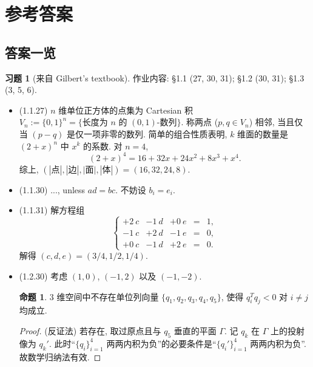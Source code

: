 \documentclass[11pt]{ctexart}
\theoremstyle{definition}
\numberwithin{equation}{section}
\theoremstyle{definition}
\newtheorem*{proposition}{命题}
\newtheorem*{exercise}{习题}
\theoremstyle{remark}
\begin{document}
\newpage

\section{参考答案}

\subsection{答案一览}

\begin{exercise}[来自 Gilbert's textbook]
    作业内容: \S 1.1 (27, 30, 31); \S 1.2 (30, 31); \S 1.3 (3, 5, 6). 
    \begin{aaa}
\begin{itemize}
    \item (1.1.27) $n$ 维单位正方体的点集为 Cartesian 积 $V_n:= \{0,1\}^n=\{\text{长度为 $n$ 的 $(0,1)$-数列}\}$. 称两点 ($p, q\in V_n$) 相邻, 当且仅当 $(p-q)$ 是仅一项非零的数列. 简单的组合性质表明, $k$ 维面的数量是 $(2+x)^n$ 中 $x^k$ 的系数. 对 $n=4$, 
    \begin{equation}
        (2+x)^4 = 16 + 32x + 24x^2 + 8x^3 + x^4. 
    \end{equation}
    综上, $(|\text{点}|, |\text{边}|, |\text{面}|, |\text{体}|)=(16,32,24,8)$. 
    \item (1.1.30) ..., unless $ad=bc$. 不妨设 $b_i=e_i$.
    \item (1.1.31) 解方程组 
    \begin{equation}
        \left\{\begin{matrix}
            +2\ c & -1\ d & +0\ e & = & 1,\\
            -1\ c & +2\ d & -1\ e & = & 0,\\
            +0\ c & -1\ d & +2\ e & = & 0.
            \end{matrix}\right.
    \end{equation}
    解得 $(c,d,e)=(3/4, 1/2, 1/4)$. 
    \item (1.2.30) 考虑 $(1,0)$, $(-1,2)$ 以及 $(-1,-2)$. 
    \begin{pinked}
        \begin{proposition}
            $3$ 维空间中不存在单位列向量 $\{q_1,q_2,q_3,q_4,q_5\}$, 使得 $q_i^Tq_j<0$ 对 $i\neq j$ 均成立. 
        \begin{proof}
            (反证法) 若存在, 取过原点且与 $q_5$ 垂直的平面 $\Gamma$. 记 $q_k$ 在 $\Gamma$ 上的投射像为 $q_k'$. 此时``$\{q_i\}_{i=1}^4$ 两两内积为负''的必要条件是``$\{q_i'\}_{i=1}^4$ 两两内积为负''. 故数学归纳法有效. 
        \end{proof}

\end{proposition}
\end{pinked}
\end{itemize}
\end{aaa}
\end{exercise}
\end{document}
